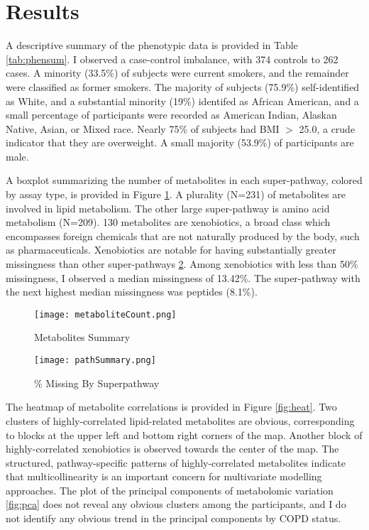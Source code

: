 \documentclass{article}
\begin{document}
\section*{Results}

A descriptive summary of the phenotypic data is provided in Table \ref{tab:phensum}. I observed a case-control imbalance, with 374 controls to 262 cases. A minority (33.5\%) of subjects were current smokers, and the remainder were classified as former smokers. The majority of subjects (75.9\%) self-identified as White, and a substantial minority (19\%) identifed as African American, and a small percentage of participants were recorded as American Indian, Alaskan Native, Asian, or Mixed race. Nearly 75\% of subjects had BMI \(>\) 25.0, a crude indicator that they are overweight. A small majority (53.9\%) of participants are male.

A boxplot summarizing the number of metabolites in each super-pathway, colored by assay type, is provided in Figure \ref{fig:metabSum}. A plurality (N=231) of metabolites are involved in lipid metabolism. The other large super-pathway is amino acid metabolism (N=209). 130 metabolites are xenobiotics, a broad class which encompasses foreign chemicals that are not naturally produced by the body, such as pharmaceuticals. Xenobiotics are notable for having substantially greater missingness than other super-pathways \ref{fig:pathMiss}. Among xenobiotics with less than 50\% missingness, I observed a median missingness of 13.42\%. The super-pathway with the next highest median missingness was peptides (8.1\%).



\begin{figure}
  \centering
  \caption{Metabolites Summary}
  \texttt{[image: metaboliteCount.png]}
  \label{fig:metabSum}
  \end{figure}

\begin{figure}
  \centering
  \caption{\% Missing By Superpathway}
  \texttt{[image: pathSummary.png]}
  \label{fig:pathMiss}
  \end{figure}

The heatmap of metabolite correlations is provided in Figure \ref{fig:heat}. Two clusters of highly-correlated lipid-related metabolites are obvious, corresponding to blocks at the upper left and bottom right corners of the map. Another block of highly-correlated xenobiotics is observed towards the center of the map. The structured, pathway-specific patterns of highly-correlated metabolites indicate that multicollinearity is an important concern for multivariate modelling approaches. The plot of the principal components of metabolomic variation \ref{fig:pca} does not reveal any obvious clusters among the participants, and I do not identify any obvious trend in the principal components by COPD status.
\end{document}
